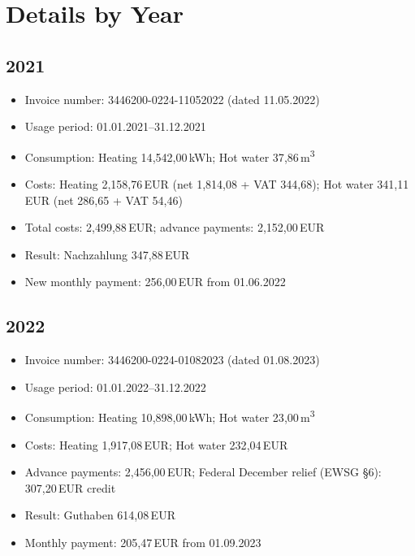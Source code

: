 \documentclass[11pt,a4paper]{article}
\begin{document}
\section*{Details by Year}

\subsection*{2021}
\begin{itemize}
  \item Invoice number: 3446200-0224-11052022 (dated 11.05.2022)
  \item Usage period: 01.01.2021--31.12.2021
  \item Consumption: Heating 14{,}542{,}00\,kWh; Hot water 37{,}86\,m\textsuperscript{3}
  \item Costs: Heating 2{,}158{,}76\,EUR (net 1{,}814{,}08 + VAT 344{,}68); Hot water 341{,}11\,EUR (net 286{,}65 + VAT 54{,}46)
  \item Total costs: 2{,}499{,}88\,EUR; advance payments: 2{,}152{,}00\,EUR
  \item Result: Nachzahlung 347{,}88\,EUR
  \item New monthly payment: 256{,}00\,EUR from 01.06.2022
\end{itemize}

\subsection*{2022}
\begin{itemize}
  \item Invoice number: 3446200-0224-01082023 (dated 01.08.2023)
  \item Usage period: 01.01.2022--31.12.2022
  \item Consumption: Heating 10{,}898{,}00\,kWh; Hot water 23{,}00\,m\textsuperscript{3}
  \item Costs: Heating 1{,}917{,}08\,EUR; Hot water 232{,}04\,EUR
  \item Advance payments: 2{,}456{,}00\,EUR; Federal December relief (EWSG \S{}6): 307{,}20\,EUR credit
  \item Result: Guthaben 614{,}08\,EUR
  \item Monthly payment: 205{,}47\,EUR from 01.09.2023
\end{itemize}
\end{document}
